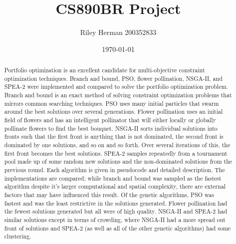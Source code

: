 \documentclass{article}
\title{CS890BR Project}
\date{\today}
\author{Riley Herman 200352833}
\begin{document}
    \maketitle
    \begin{abstract}
        Portfolio optimization is an excellent candidate for multi-objective constraint optimization techniques. Branch and bound, PSO, flower 
        pollination, NSGA-II, and SPEA-2 were implemented and compared to solve the portfolio optimization problem. Branch and bound is an 
        exact method of solving constraint optimization problems that mirrors common searching techniques. PSO uses many initial particles that
        swarm around the best solutions over several generations. Flower pollination uses an initial field of flowers and has an intelligent
        pollinator that will either locally or globally pollinate flowers to find the best bouquet. NSGA-II sorts individual solutions into 
        fronts such that the first front is anything that is not dominated, the second front is dominated by one solutions, and so on and so forth.
        Over several iterations of this, the first front becomes the best solutions. SPEA-2 samples repeatedly from a tournament pool made up of some 
        random new solutions and the non-dominated solutions from the previous round. Each algorithm is given in pseudocode and detailed description.
        The implementations are compared; while branch and bound was sampled as the fastest algorithm despite it's larger computational and spatial 
        complexity, there are external factors that may have influenced this result. Of the genetic algorithms, PSO was fastest and was the least 
        restrictive in the solutions generated. Flower pollination had the fewest solutions generated but all were of high quality. NSGA-II and SPEA-2
        had similar solutions except in terms of crowding, where NSGA-II had a more spread out front of solutions and SPEA-2 (as well as all of the 
        other genetic algorithms) had some clustering. 
    \end{abstract}
    \newpage
\end{document}
